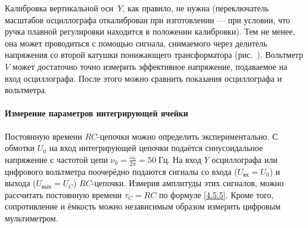 Калибровка вертикальной оси~$Y$, как правило, не нужна
(переключатель масштабов осциллографа откалиброван при изготовлении ---
при условии, что ручка плавной регулировки находится в положении
калибровки). Тем не менее, она может проводиться с помощью сигнала,
снимаемого через делитель напряжения со второй катушки понижающего трансформатора
(рис.~). Вольтметр $V$ может достаточно точно
измерить эффективное напряжение, подаваемое на вход осциллографа. После
этого можно сравнить показания осциллографа и вольтметра.

\paragraph{Измерение параметров интегрирующей ячейки}
Постоянную времени $RC$-цепочки можно определить экспериментально.
С обмотки $U_0$ на вход интегрирующей цепочки подаётся синусоидальное напряжение
с частотой цепи $\nu_0=\frac{\omega_0}{2\pi}=50\;Гц$.
На вход $Y$ осциллографа или цифрового вольтметра поочерёдно
подаются сигналы со входа ($U_\text{вх}=U_0$) и выхода ($U_\text{вых} = U_C$)
$RC$-цепочки. Измерив амплитуды этих сигналов, можно рассчитать постоянную
времени $\tau_C= RC$ по формуле \eqref{4.5.5}.
Кроме того, сопротивление и ёмкость можно независимым образом измерить
цифровым мультиметром.

